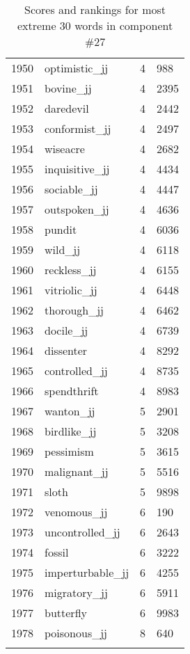 \begin{longtable}[!htbp]{| rlr@{.}l |}
    1950 & optimistic\_jj & 4 & 988 \\
    1951 & bovine\_jj & 4 & 2395 \\
    1952 & daredevil & 4 & 2442 \\
    1953 & conformist\_jj & 4 & 2497 \\
    1954 & wiseacre & 4 & 2682 \\
    1955 & inquisitive\_jj & 4 & 4434 \\
    1956 & sociable\_jj & 4 & 4447 \\
    1957 & outspoken\_jj & 4 & 4636 \\
    1958 & pundit & 4 & 6036 \\
    1959 & wild\_jj & 4 & 6118 \\
    1960 & reckless\_jj & 4 & 6155 \\
    1961 & vitriolic\_jj & 4 & 6448 \\
    1962 & thorough\_jj & 4 & 6462 \\
    1963 & docile\_jj & 4 & 6739 \\
    1964 & dissenter & 4 & 8292 \\
    1965 & controlled\_jj & 4 & 8735 \\
    1966 & spendthrift & 4 & 8983 \\
    1967 & wanton\_jj & 5 & 2901 \\
    1968 & birdlike\_jj & 5 & 3208 \\
    1969 & pessimism & 5 & 3615 \\
    1970 & malignant\_jj & 5 & 5516 \\
    1971 & sloth & 5 & 9898 \\
    1972 & venomous\_jj & 6 & 190 \\
    1973 & uncontrolled\_jj & 6 & 2643 \\
    1974 & fossil & 6 & 3222 \\
    1975 & imperturbable\_jj & 6 & 4255 \\
    1976 & migratory\_jj & 6 & 5911 \\
    1977 & butterfly & 6 & 9983 \\
    1978 & poisonous\_jj & 8 & 640 \\
    \hline
    \caption{Scores and rankings for most extreme 30 words in component \#27} \\
\end{longtable}

